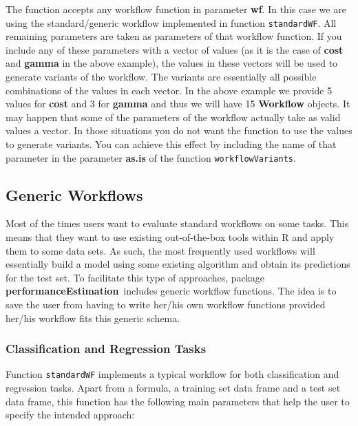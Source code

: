 \documentclass[10pt,a4paper]{article}\usepackage[]{graphicx}\usepackage[]{color}
\newcommand{\PE}{package \textbf{performanceEstimation}\ }
\begin{document}
The function accepts any workflow function in parameter
\textbf{wf}. In this case we are using the standard/generic workflow implemented in function \texttt{standardWF}. All remaining parameters are taken as parameters of that
workflow function. If you include  any of these parameters with a vector of values
(as it is the case of \textbf{cost} and \textbf{gamma} in the above
example), the values in these vectors will be used to generate
variants of the workflow. The variants are essentially all possible
combinations of the values in each vector. In the above example we
provide 5 values for \textbf{cost} and 3 for \textbf{gamma} and thus
we will have 15 \textbf{Workflow} objects. It may happen that some of
the parameters of the workflow actually take as valid values a
vector. In those situations you do not want the function to use the
values to generate variants. You can achieve this effect by including
the name of that parameter in the parameter \textbf{as.is} of the
function \texttt{workflowVariants}.


\subsection{Generic Workflows}

Most of the times users want to evaluate standard workflows on some tasks. This means that they want to use existing out-of-the-box tools within R and apply them to some data sets.  As such, 
the most frequently used workflows will essentially build a model
using some existing algorithm and obtain its predictions for the test set. To facilitate this type of approaches, \PE includes generic workflow functions. The idea is to save the user
from having to write her/his own workflow functions provided her/his workflow fits
this generic schema.

\subsubsection{Classification and Regression Tasks}\label{sec:standardWF}

Function \texttt{standardWF} implements a typical workflow for both
classification and regression tasks. Apart from a formula, a training set data frame and a test set data frame, this function has the following main parameters that help the user to specify the intended approach:
\end{document}

